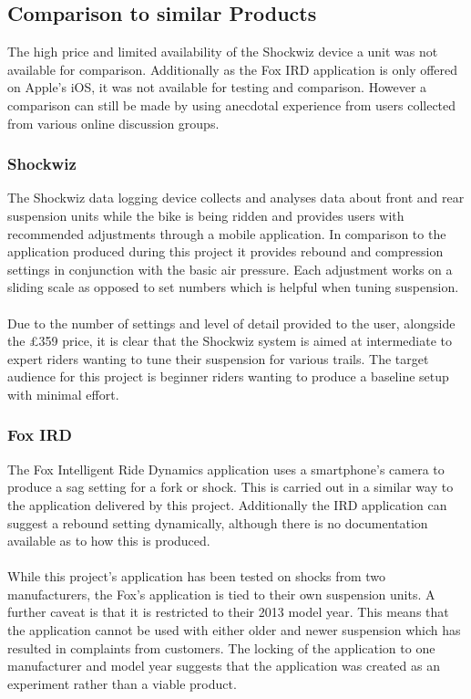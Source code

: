 	\subsection{Comparison to similar Products}
		The high price and limited availability of the Shockwiz device a unit was not available for comparison. Additionally as the Fox IRD application is only offered on Apple's iOS, it was not available for testing and comparison. However a comparison can still be made by using anecdotal experience from users collected from various online discussion groups.
		\subsubsection{Shockwiz}
			The Shockwiz data logging device \citep{quarq2017shockwiz} collects and analyses data about front and rear suspension units while the bike is being ridden and provides users with recommended adjustments through a mobile application. In comparison to the application produced during this project it provides rebound and compression settings in conjunction with the basic air pressure. Each adjustment works on a sliding scale as opposed to set numbers which is helpful when tuning suspension.
			\\\\
			Due to the number of settings and level of detail provided to the user, alongside the £359 price, it is clear that the Shockwiz system is aimed at intermediate to expert riders wanting to tune their suspension for various trails. The target audience for this project is beginner riders wanting to produce a baseline setup with minimal effort. 
		\subsubsection{Fox IRD}
			The Fox Intelligent Ride Dynamics application \cite{fox2015ird} uses a smartphone's camera to produce a sag setting for a fork or shock. This is carried out in a similar way to the application delivered by this project. Additionally the IRD application can suggest a rebound setting dynamically, although there is no documentation available as to how this is produced.
			\\\\
			While this project's application has been tested on shocks from two manufacturers, the Fox's application is tied to their own suspension units. A further caveat is that it is restricted to their 2013 model year. This means that the application cannot be used with either older and newer suspension which has resulted in complaints from customers. The locking of the application to one manufacturer and model year suggests that the application was created as an experiment rather than a viable product.
